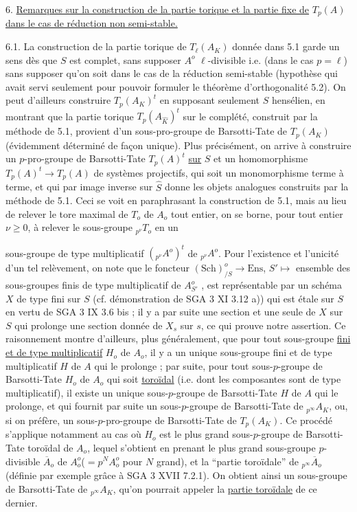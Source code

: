6. \underline{Remarques sur la construction de la partie torique et la partie fixe de} $T_p(A)$ \underline{dans le cas de réduction non semi-stable.}

6.1. La construction de la partie torique de $T_\ell(A_K)$ donnée dans 5.1 garde un sens dès que $S$ est complet, sans supposer $A^o$ $\ell$-divisible i.e. (dans le cas $p = \ell$) sans supposer qu'on soit dans le cas de la réduction semi-stable (hypothèse qui avait servi seulement pour pouvoir formuler le théorème d'orthogonalité 5.2). On peut d'ailleurs construire $T_p(A_K)^t$ en supposant seulement $S$ hensélien, en montrant que la partie torique $T_p(A_{\hat{K}})^t$ sur le complété, construit par la méthode de 5.1, provient d'un sous-pro-groupe de Barsotti-Tate de $T_p(A_K)$ (évidemment déterminé de façon unique). Plus précisément, on arrive à construire un $p$-pro-groupe de Barsotti-Tate $T_p(A)^t$ \underline{sur} $S$ et un homomorphisme $T_p(A)^t \longrightarrow T_p(A)$ de systèmes projectifs, qui soit un monomorphisme terme à terme, et qui par image inverse sur $\hat{S}$ donne les objets analogues construits par la méthode de 5.1. Ceci se voit en paraphrasant la construction de 5.1, mais au lieu de relever le tore maximal de $T_o$ de $A_o$ tout entier, on se borne, pour tout entier $\nu \geq 0$, à relever le sous-groupe ${}_{p^\nu}T_o$ en un



sous-groupe de type multiplicatif $({}_{p^\nu}A^o)^t$ de ${}_{p^\nu}A^o$. Pour l'existence et l'unicité d'un tel relèvement, on note que le foncteur $(\mathrm{Sch})^o_{/S} \longrightarrow \mathrm{Ens}$, $S' \longmapsto$ ensemble des sous-groupes finis de type multiplicatif de $A^o_{S'}$ , est représentable par un schéma $X$ de type fini sur $S$ (cf. démonstration de SGA 3 XI 3.12 a)) qui est étale sur $S$ en vertu de SGA 3 IX 3.6 bis ; il y a par suite une section et une seule de $X$ sur $S$ qui prolonge une section donnée de $X_s$ sur $s$, ce qui prouve notre assertion. Ce raisonnement montre d'ailleurs, plus généralement, que pour tout sous-groupe \underline{fini et de type multiplicatif} $H_o$ de $A_o$, il y a un unique sous-groupe fini et de type multiplicatif $H$ de $A$ qui le prolonge ; par suite, pour tout sous-$p$-groupe de Barsotti-Tate $H_o$ de $A_o$ qui soit \underline{toroïdal} (i.e. dont les composantes sont de type multiplicatif), il existe un unique sous-$p$-groupe de Barsotti-Tate $H$ de $A$ qui le prolonge, et qui fournit par suite un sous-$p$-groupe de Barsotti-Tate de ${}_{p^\infty}A_K$, ou, si on préfère, un sous-$p$-pro-groupe de Barsotti-Tate de $T_p(A_K)$. Ce procédé s'applique notamment au cas où $H_o$ est le plus grand sous-$p$-groupe de Barsotti-Tate toroïdal de $A_o$, lequel s'obtient en prenant le plus grand sous-groupe $p$-divisible $\overline{A}_o$ de $A_o^o$($= p^N A_o^o$ pour $N$ grand), et la ``partie toroïdale'' de ${}_{p^\infty}\overline{A}_o$ (définie par exemple grâce à SGA 3 XVII 7.2.1). On obtient ainsi un sous-groupe de Barsotti-Tate de ${}_{p^\infty}A_K$, qu'on pourrait appeler la \underline{partie toroïdale} de ce dernier.

